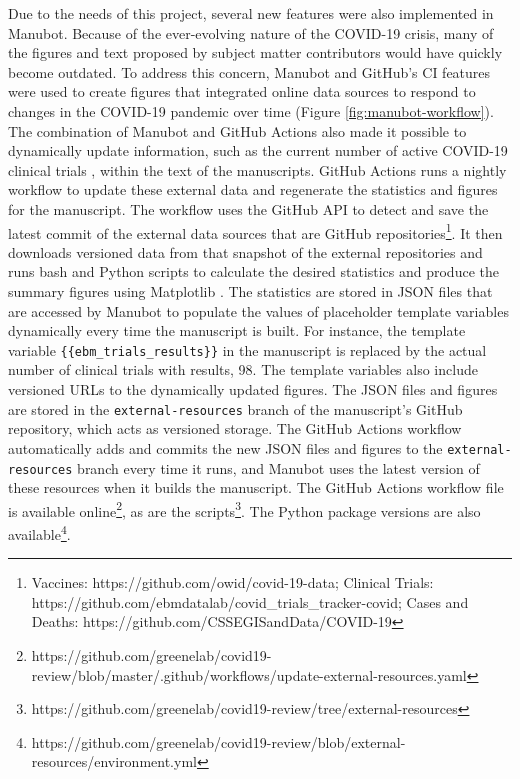 \documentclass[twocolumn]{ceurart}
\begin{document}
Due to the needs of this project, several new features were also implemented in Manubot.
Because of the ever-evolving nature of the COVID-19 crisis, many of the figures and text proposed by subject matter contributors would have quickly become outdated.
To address this concern, Manubot and GitHub's CI features were used to create figures that integrated online data sources to respond to changes in the COVID-19 pandemic over time (Figure \ref{fig:manubot-workflow}).
The combination of Manubot and GitHub Actions also made it possible to dynamically update information, such as the current number of active COVID-19 clinical trials \citep{cifK9B8t}, within the text of the manuscripts.
GitHub Actions runs a nightly workflow to update these external data and regenerate the statistics and figures for the manuscript.
The workflow uses the GitHub API to detect and save the latest commit of the external data sources that are GitHub repositories\footnote{Vaccines: https://github.com/owid/covid-19-data; Clinical Trials: https://github.com/ebmdatalab/covid\_trials\_tracker-covid; Cases and Deaths: https://github.com/CSSEGISandData/COVID-19}.
It then downloads versioned data from that snapshot of the external repositories and runs bash and Python scripts to calculate the desired statistics and produce the summary figures using Matplotlib \citep{1026Gxdsi}.
The statistics are stored in JSON files that are accessed by Manubot to populate the values of placeholder template variables dynamically every time the manuscript is built.
For instance, the template variable \texttt{\{\{ebm\_trials\_results\}\}} in the manuscript is replaced by the actual number of clinical trials with results, 98.
The template variables also include versioned URLs to the dynamically updated figures.
The JSON files and figures are stored in the \texttt{external-resources} branch of the manuscript's GitHub repository, which acts as versioned storage.
The GitHub Actions workflow automatically adds and commits the new JSON files and figures to the \texttt{external-resources} branch every time it runs, and Manubot uses the latest version of these resources when it builds the manuscript.
The GitHub Actions workflow file is available online\footnote{https://github.com/greenelab/covid19-review/blob/master/.github/workflows/update-external-resources.yaml}, as are the scripts\footnote{https://github.com/greenelab/covid19-review/tree/external-resources}.
The Python package versions are also available\footnote{https://github.com/greenelab/covid19-review/blob/external-resources/environment.yml}.
\end{document}
